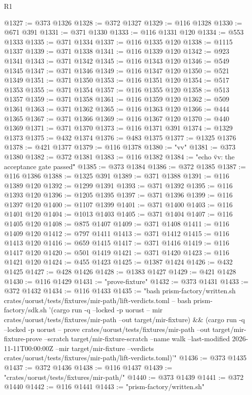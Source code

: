 \begin{lexlean}{R1}
\begin{coremodule}
@1327 := @373 @1326
@1328 := @372 @1327
@1329 := @116 @1328
@1330 := @671 @391
@1331 := @371 @1330
@1333 := @116 @1331 @120
@1334 := @553 @1333
@1335 := @371 @1334
@1337 := @116 @1335 @120
@1338 := @1115 @1337
@1339 := @371 @1338
@1341 := @116 @1339 @120
@1342 := @923 @1341
@1343 := @371 @1342
@1345 := @116 @1343 @120
@1346 := @549 @1345
@1347 := @371 @1346
@1349 := @116 @1347 @120
@1350 := @521 @1349
@1351 := @371 @1350
@1353 := @116 @1351 @120
@1354 := @517 @1353
@1355 := @371 @1354
@1357 := @116 @1355 @120
@1358 := @513 @1357
@1359 := @371 @1358
@1361 := @116 @1359 @120
@1362 := @509 @1361
@1363 := @371 @1362
@1365 := @116 @1363 @120
@1366 := @444 @1365
@1367 := @371 @1366
@1369 := @116 @1367 @120
@1370 := @440 @1369
@1371 := @371 @1370
@1373 := @116 @1371 @391
@1374 := @1329 @1373
@1375 := @432 @1374
@1376 := @483 @1375
@1377 := @1325 @1376
@1378 := @421 @1377
@1379 := @116 @1378
@1380 := "vv"
@1381 := @373 @1380
@1382 := @372 @1381
@1383 := @116 @1382
@1384 := "echo \"vv: the acceptance gate passed\""
@1385 := @373 @1384
@1386 := @372 @1385
@1387 := @116 @1386
@1388 := @1325 @391
@1389 := @371 @1388
@1391 := @116 @1389 @120
@1392 := @1299 @1391
@1393 := @371 @1392
@1395 := @116 @1393 @120
@1396 := @1205 @1395
@1397 := @371 @1396
@1399 := @116 @1397 @120
@1400 := @1107 @1399
@1401 := @371 @1400
@1403 := @116 @1401 @120
@1404 := @1013 @1403
@1405 := @371 @1404
@1407 := @116 @1405 @120
@1408 := @875 @1407
@1409 := @371 @1408
@1411 := @116 @1409 @120
@1412 := @797 @1411
@1413 := @371 @1412
@1415 := @116 @1413 @120
@1416 := @659 @1415
@1417 := @371 @1416
@1419 := @116 @1417 @120
@1420 := @501 @1419
@1421 := @371 @1420
@1423 := @116 @1421 @120
@1424 := @455 @1423
@1425 := @1387 @1424
@1426 := @432 @1425
@1427 := @428 @1426
@1428 := @1383 @1427
@1429 := @421 @1428
@1430 := @116 @1429
@1431 := "prove-fixture"
@1432 := @373 @1431
@1433 := @372 @1432
@1434 := @116 @1433
@1435 := "bash prism-factory/written.sh crates/uorust/tests/fixtures/mir-path/lift-verdicts.toml -- bash prism-factory/sdk.sh '(cargo run -q --locked -p uorust -- mir crates/uorust/tests/fixtures/mir-path --out target/mir-fixture) && (cargo run -q --locked -p uorust -- prove crates/uorust/tests/fixtures/mir-path --out target/mir-fixture-prove --scratch target/mir-fixture-scratch --name walk --last-modified 2026-11-11T00:00:00Z --mir target/mir-fixture --verdicts crates/uorust/tests/fixtures/mir-path/lift-verdicts.toml)'"
@1436 := @373 @1435
@1437 := @372 @1436
@1438 := @116 @1437
@1439 := "crates/uorust/tests/fixtures/mir-path/"
@1440 := @373 @1439
@1441 := @372 @1440
@1442 := @116 @1441
@1443 := "prism-factory/written.sh"

\end{coremodule}
\end{lexlean}
